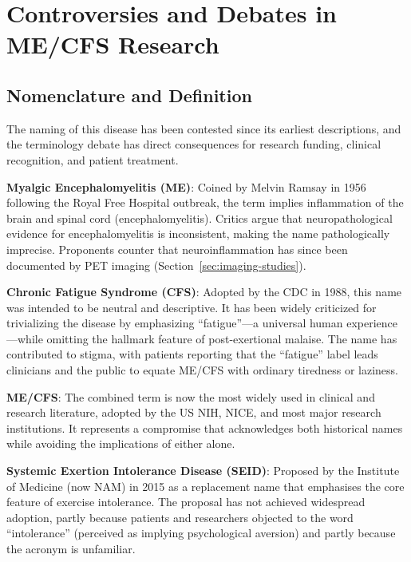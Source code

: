 \chapter{Controversies and Debates in ME/CFS Research}
\label{ch:controversies}

\section{Nomenclature and Definition}
\label{sec:nomenclature-controversy}

The naming of this disease has been contested since its earliest descriptions, and the terminology debate has direct consequences for research funding, clinical recognition, and patient treatment.

\textbf{Myalgic Encephalomyelitis (ME)}: Coined by Melvin Ramsay in 1956 following the Royal Free Hospital outbreak, the term implies inflammation of the brain and spinal cord (encephalomyelitis). Critics argue that neuropathological evidence for encephalomyelitis is inconsistent, making the name pathologically imprecise. Proponents counter that neuroinflammation has since been documented by PET imaging (Section~\ref{sec:imaging-studies}).

\textbf{Chronic Fatigue Syndrome (CFS)}: Adopted by the CDC in 1988, this name was intended to be neutral and descriptive. It has been widely criticized for trivializing the disease by emphasizing ``fatigue''---a universal human experience---while omitting the hallmark feature of post-exertional malaise. The name has contributed to stigma, with patients reporting that the ``fatigue'' label leads clinicians and the public to equate ME/CFS with ordinary tiredness or laziness.

\textbf{ME/CFS}: The combined term is now the most widely used in clinical and research literature, adopted by the US NIH, NICE, and most major research institutions. It represents a compromise that acknowledges both historical names while avoiding the implications of either alone.

\textbf{Systemic Exertion Intolerance Disease (SEID)}: Proposed by the Institute of Medicine (now NAM) in 2015 as a replacement name that emphasises the core feature of exercise intolerance. The proposal has not achieved widespread adoption, partly because patients and researchers objected to the word ``intolerance'' (perceived as implying psychological aversion) and partly because the acronym is unfamiliar.

